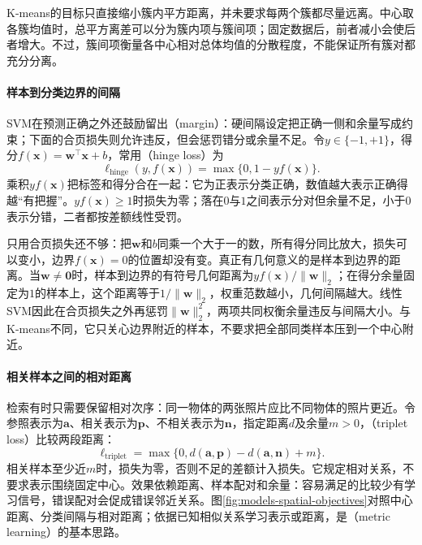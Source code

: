 K-means的目标只直接缩小簇内平方距离，并未要求每两个簇都尽量远离。中心取各簇均值时，总平方离差可以分为簇内项与簇间项；固定数据后，前者减小会使后者增大。不过，簇间项衡量各中心相对总体均值的分散程度，不能保证所有簇对都充分分离。

\paragraph{样本到分类边界的间隔}

SVM在预测正确之外还鼓励留出（margin）：硬间隔设定把正确一侧和余量写成约束；下面的合页损失则允许违反，但会惩罚错分或余量不足。令$y\in\{-1,+1\}$，得分$f(\bm{x})=\bm{w}^{\top}\bm{x}+b$，常用（hinge loss）为
\begin{equation}
  \ell_{\mathrm{hinge}}(y,f(\bm{x}))
  =\max\{0,1-yf(\bm{x})\}.
  \label{eq:models-hinge}
\end{equation}
乘积$yf(\bm{x})$把标签和得分合在一起：它为正表示分类正确，数值越大表示正确得越“有把握”。$yf(\bm{x})\ge1$时损失为零；落在$0$与$1$之间表示分对但余量不足，小于$0$表示分错，二者都按差额线性受罚。

只用合页损失还不够：把$\bm{w}$和$b$同乘一个大于一的数，所有得分同比放大，损失可以变小，边界$f(\bm{x})=0$的位置却没有变。真正有几何意义的是样本到边界的距离。当$\bm{w}\ne\bm{0}$时，样本到边界的有符号几何距离为$yf(\bm{x})/\|\bm{w}\|_2$；在得分余量固定为$1$的样本上，这个距离等于$1/\|\bm{w}\|_2$，权重范数越小，几何间隔越大。线性SVM因此在合页损失之外再惩罚$\|\bm{w}\|_2^2$，两项共同权衡余量违反与间隔大小。与K-means不同，它只关心边界附近的样本，不要求把全部同类样本压到一个中心附近。

\paragraph{相关样本之间的相对距离}

检索有时只需要保留相对次序：同一物体的两张照片应比不同物体的照片更近。令参照表示为$\bm{a}$、相关表示为$\bm{p}$、不相关表示为$\bm{n}$，指定距离$d$及余量$m>0$，（triplet loss）比较两段距离：
\begin{equation}
  \ell_{\mathrm{triplet}}
  =\max\{0,d(\bm{a},\bm{p})-d(\bm{a},\bm{n})+m\}.
  \label{eq:models-triplet}
\end{equation}
相关样本至少近$m$时，损失为零，否则不足的差额计入损失。它规定相对关系，不要求表示围绕固定中心。效果依赖距离、样本配对和余量：容易满足的比较少有学习信号，错误配对会促成错误邻近关系。图\ref{fig:models-spatial-objectives}对照中心距离、分类间隔与相对距离；依据已知相似关系学习表示或距离，是（metric learning）的基本思路。

